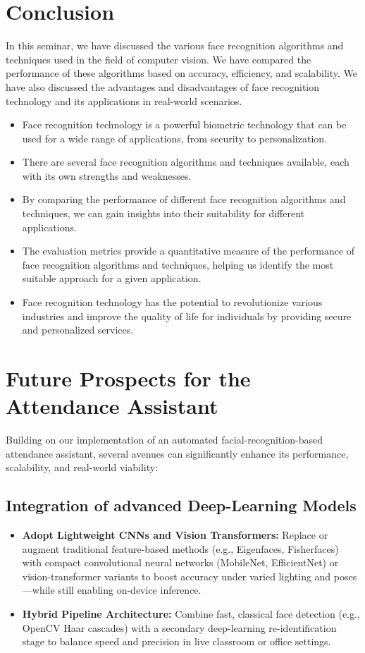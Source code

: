 \documentclass[openany]{report}
\begin{document}
\chapter{Conclusion}
In this seminar, we have discussed the various face recognition algorithms and techniques used in the field of computer vision. We have compared the performance of these algorithms based on accuracy, efficiency, and scalability. We have also discussed the advantages and disadvantages of face recognition technology and its applications in real-world scenarios.

\begin{itemize}
    \item Face recognition technology is a powerful biometric technology that can be used for a wide range of applications, from security to personalization.
    \item There are several face recognition algorithms and techniques available, each with its own strengths and weaknesses.
    \item By comparing the performance of different face recognition algorithms and techniques, we can gain insights into their suitability for different applications.
    \item The evaluation metrics provide a quantitative measure of the performance of face recognition algorithms and techniques, helping us identify the most suitable approach for a given application.
    \item Face recognition technology has the potential to revolutionize various industries and improve the quality of life for individuals by providing secure and personalized services.
\end{itemize}
\clearpage

\chapter{Future Prospects for the Attendance Assistant }
Building on our implementation of an automated facial-recognition-based attendance assistant, several avenues can significantly enhance its performance, scalability, and real-world viability:
\section{Integration of advanced Deep-Learning Models}
\begin{itemize}
    \item \textbf{Adopt Lightweight CNNs and Vision Transformers:} Replace or augment traditional feature-based methods (e.g., Eigenfaces, Fisherfaces) with compact convolutional neural networks (MobileNet, EfficientNet) or vision-transformer variants to boost accuracy under varied lighting and poses—while still enabling on-device inference.
    \item \textbf{Hybrid Pipeline Architecture:} Combine fast, classical face detection (e.g., OpenCV Haar cascades) with a secondary deep-learning re-identification stage to balance speed and precision in live classroom or office settings.
\end{itemize}
\end{document}
